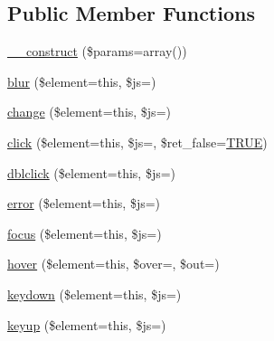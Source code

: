 \subsection*{Public Member Functions}
\begin{DoxyCompactItemize}
\item 
\mbox{\hyperlink{class_c_i___javascript_a568ecdb0d73d2a870f33189739922a50}{\+\_\+\+\_\+construct}} (\$params=array())
\item 
\mbox{\hyperlink{class_c_i___javascript_a3aacb753ebd61030bad68fb877e52699}{blur}} (\$element=\textquotesingle{}this\textquotesingle{}, \$js=\textquotesingle{}\textquotesingle{})
\item 
\mbox{\hyperlink{class_c_i___javascript_a65a4442663cf513c7f18abfc6f0955aa}{change}} (\$element=\textquotesingle{}this\textquotesingle{}, \$js=\textquotesingle{}\textquotesingle{})
\item 
\mbox{\hyperlink{class_c_i___javascript_a508491310edc8bcb766f0adc89ec24c4}{click}} (\$element=\textquotesingle{}this\textquotesingle{}, \$js=\textquotesingle{}\textquotesingle{}, \$ret\+\_\+false=\mbox{\hyperlink{constants_8php_ae04a3efe6aa42044f803ee90c2277846}{T\+R\+UE}})
\item 
\mbox{\hyperlink{class_c_i___javascript_a9f2699300751803206016d510d448ea0}{dblclick}} (\$element=\textquotesingle{}this\textquotesingle{}, \$js=\textquotesingle{}\textquotesingle{})
\item 
\mbox{\hyperlink{class_c_i___javascript_ac6c4977af5ec27a5addbb3b2a28912e2}{error}} (\$element=\textquotesingle{}this\textquotesingle{}, \$js=\textquotesingle{}\textquotesingle{})
\item 
\mbox{\hyperlink{class_c_i___javascript_aa00a3db94f50b79b948d90a48e4bc286}{focus}} (\$element=\textquotesingle{}this\textquotesingle{}, \$js=\textquotesingle{}\textquotesingle{})
\item 
\mbox{\hyperlink{class_c_i___javascript_a6f8cfdbca8f6b2c2d68bb9a38a8f96a7}{hover}} (\$element=\textquotesingle{}this\textquotesingle{}, \$over=\textquotesingle{}\textquotesingle{}, \$out=\textquotesingle{}\textquotesingle{})
\item 
\mbox{\hyperlink{class_c_i___javascript_ad707956fd5a0588de445d786396b33ec}{keydown}} (\$element=\textquotesingle{}this\textquotesingle{}, \$js=\textquotesingle{}\textquotesingle{})
\item 
\mbox{\hyperlink{class_c_i___javascript_a8c6e3a3b521c059cfd6799b3dc73d0d6}{keyup}} (\$element=\textquotesingle{}this\textquotesingle{}, \$js=\textquotesingle{}\textquotesingle{})

\end{DoxyCompactItemize}
